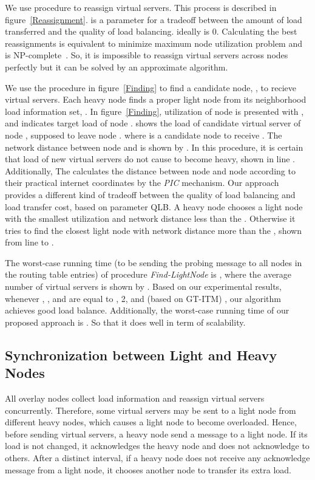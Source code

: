 \documentclass {article}
\begin{document}
We use procedure   to reassign virtual servers. This process  is described in
 figure~\ref{Reassignment}.  is a parameter for a tradeoff between the amount of load transferred and the quality of load balancing.  ideally is 0.
Calculating the best reassignments is equivalent to minimize maximum node utilization  problem and
is NP-complete~\cite{NP-Complete}. So, it is impossible to reassign virtual servers across nodes perfectly but it can be solved by an approximate algorithm.

We use the procedure in  figure~\ref{Finding} to find a candidate node, , to recieve virtual servers. Each heavy node  finds a proper light node from its neighborhood load information set, .
In figure~\ref{Finding},
utilization of node  is presented with , and  indicates target
load of node .
 shows the load of candidate virtual server of node , supposed to leave node .
 where  is a candidate node to receive .
 The network distance between node   and  is shown by .
In this procedure, it is certain that load of new virtual servers do not cause  to become heavy, shown in line . Additionally, The  calculates the distance between node  and node   according to their practical internet coordinates by the \emph{PIC} mechanism.
Our approach provides a different kind of tradeoff between the quality of load balancing and load
transfer cost, based on parameter QLB. A heavy node chooses a light node with the smallest utilization and network distance less than the . Otherwise it tries to find the closest light node with network distance more than the , shown from line  to .

The worst-case running time (to be sending the probing message to all nodes in the routing table entries) of procedure \emph{Find-LightNode} is , where the average number of virtual servers is shown by . Based on our experimental results, whenever , ,  and   are equal to
, 2,  and (based on GT-ITM\cite{GT-ITM}) , our algorithm achieves good load balance. Additionally, the  worst-case running
 time of our proposed approach is . So that it  does well in term of scalability.
\subsection {Synchronization between Light and Heavy Nodes}
All overlay nodes  collect load information and reassign virtual servers concurrently. Therefore, some virtual servers may be sent to a light node from different heavy nodes, which causes a light node to become overloaded. Hence, before sending virtual servers, a heavy node send a   message to a light node. If its load is not changed, it acknowledges the heavy node and does not acknowledge to others. After a distinct interval,
 if a heavy node does not receive any acknowledge message from a light node,  it chooses
 another node to transfer its extra load.
\end{document}
